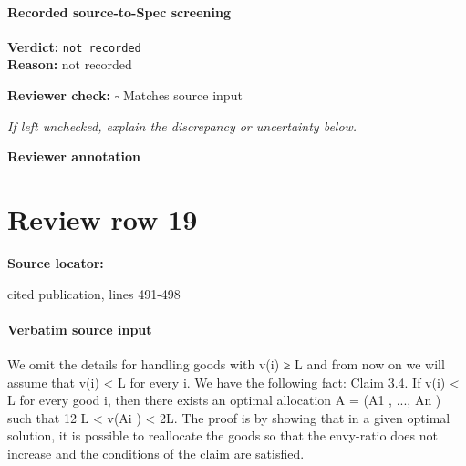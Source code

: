 \documentclass[10pt]{article}
\newcommand{\reviewerbox}{%
  \par\noindent\fbox{\parbox{0.96\linewidth}{\rule{0pt}{0.38in}}}\par
}
\newcommand{\reviewmatch}[1]{%
  \par\noindent\textbf{Reviewer check:} $\square$\; #1\par
  \noindent\emph{If left unchecked, explain the discrepancy or uncertainty below.}\par
}
\begin{document}
\paragraph{Recorded source-to-Spec screening}
\textbf{Verdict:} \texttt{not recorded}
\\
\textbf{Reason:} not recorded
\reviewmatch{Matches source input}
\noindent\textbf{Reviewer annotation}\par
\reviewerbox
\clearpage
\hypertarget{source-claim-47e5534cdf1bff13}{}
\section*{Review row 19}
\textbf{Source locator:} {\footnotesize\raggedright cited publication, lines 491-\allowbreak{}498\par}
\paragraph{Verbatim source input}
\begin{ReviewVerbatim}
We omit the details for handling goods with v(i) ≥ L and
from now on we will assume that v(i) < L for every i. We
have the following fact:
Claim 3.4. If v(i) < L for every good i, then there exists an optimal allocation A = (A1 , ..., An ) such that 12 L <
v(Ai ) < 2L.
The proof is by showing that in a given optimal solution, it
is possible to reallocate the goods so that the envy-ratio does
not increase and the conditions of the claim are satisfied.
\end{ReviewVerbatim}
\end{document}
